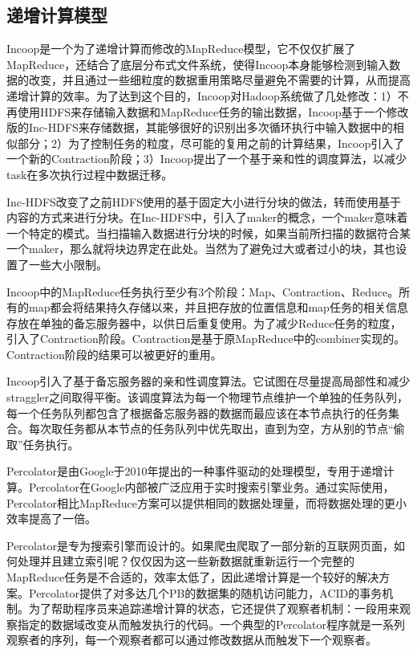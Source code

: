 \subsection{递增计算模型}

Incoop\cite{bhatotia2011incoop}是一个为了递增计算而修改的MapReduce模型，它不仅仅扩展了MapReduce，还结合了底层分布式文件系统，使得Incoop本身能够检测到输入数据的改变，并且通过一些细粒度的数据重用策略尽量避免不需要的计算，从而提高递增计算的效率。为了达到这个目的，Incoop对Hadoop系统做了几处修改：1）不再使用HDFS来存储输入数据和MapReduce任务的输出数据，Incoop基于一个修改版的Inc-HDFS来存储数据，其能够很好的识别出多次循环执行中输入数据中的相似部分；2）为了控制任务的粒度，尽可能的复用之前的计算结果，Incoop引入了一个新的Contraction阶段；3）Incoop提出了一个基于亲和性的调度算法，以减少task在多次执行过程中数据迁移。

Inc-HDFS改变了之前HDFS使用的基于固定大小进行分块的做法，转而使用基于内容的方式来进行分块。在Inc-HDFS中，引入了maker的概念，一个maker意味着一个特定的模式。当扫描输入数据进行分块的时候，如果当前所扫描的数据符合某一个maker，那么就将块边界定在此处。当然为了避免过大或者过小的块，其也设置了一些大小限制。

Incoop中的MapReduce任务执行至少有3个阶段：Map、Contraction、Reduce。所有的map都会将结果持久存储以来，并且把存放的位置信息和map任务的相关信息存放在单独的备忘服务器中，以供日后重复使用。为了减少Reduce任务的粒度，引入了Contraction阶段。Contraction是基于原MapReduce中的combiner实现的。Contraction阶段的结果可以被更好的重用。

Incoop引入了基于备忘服务器的亲和性调度算法。它试图在尽量提高局部性和减少straggler之间取得平衡。该调度算法为每一个物理节点维护一个单独的任务队列，每一个任务队列都包含了根据备忘服务器的数据而最应该在本节点执行的任务集合。每次取任务都从本节点的任务队列中优先取出，直到为空，方从别的节点“偷取”任务执行。

Percolator\cite{peng2010large}是由Google于2010年提出的一种事件驱动的处理模型，专用于递增计算。Percolator在Google内部被广泛应用于实时搜索引擎业务。通过实际使用，Percolator相比MapReduce方案可以提供相同的数据处理量，而将数据处理的更小效率提高了一倍。

Percolator是专为搜索引擎而设计的。如果爬虫爬取了一部分新的互联网页面，如何处理并且建立索引呢？仅仅因为这一些新数据就重新运行一个完整的MapReduce任务是不合适的，效率太低了，因此递增计算是一个较好的解决方案。Percolator提供了对多达几个PB的数据集的随机访问能力，ACID的事务机制。为了帮助程序员来追踪递增计算的状态，它还提供了观察者机制：一段用来观察指定的数据域改变从而触发执行的代码。一个典型的Percolator程序就是一系列观察者的序列，每一个观察者都可以通过修改数据从而触发下一个观察者。

